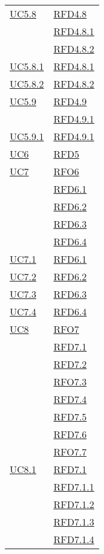 \begin{longtable}{|>{\centering}m{5cm}|m{5cm}<{\centering}|}
\hyperref[UC5.8]{UC5.8} & \hyperlink{RFD4.8}{RFD4.8}\\
& \hyperlink{RFD4.8.1}{RFD4.8.1}\\
& \hyperlink{RFD4.8.2}{RFD4.8.2}\\ \hline
\hyperref[UC5.8.1]{UC5.8.1} & \hyperlink{RFD4.8.1}{RFD4.8.1}\\ \hline
\hyperref[UC5.8.2]{UC5.8.2} & \hyperlink{RFD4.8.2}{RFD4.8.2}\\ \hline
\hyperref[UC5.9]{UC5.9} & \hyperlink{RFD4.9}{RFD4.9}\\
& \hyperlink{RFD4.9.1}{RFD4.9.1}\\ \hline
\hyperref[UC5.9.1]{UC5.9.1} & \hyperlink{RFD4.9.1}{RFD4.9.1}\\ \hline
\hyperref[UC6]{UC6} & \hyperlink{RFD5}{RFD5}\\ \hline
\hyperref[UC7]{UC7} & \hyperlink{RFO6}{RFO6}\\
& \hyperlink{RFD6.1}{RFD6.1}\\
& \hyperlink{RFD6.2}{RFD6.2}\\
& \hyperlink{RFD6.3}{RFD6.3}\\
& \hyperlink{RFD6.4}{RFD6.4}\\ \hline
\hyperref[UC7.1]{UC7.1} & \hyperlink{RFD6.1}{RFD6.1}\\ \hline
\hyperref[UC7.2]{UC7.2} & \hyperlink{RFD6.2}{RFD6.2}\\ \hline
\hyperref[UC7.3]{UC7.3} & \hyperlink{RFD6.3}{RFD6.3}\\ \hline
\hyperref[UC7.4]{UC7.4} & \hyperlink{RFD6.4}{RFD6.4}\\ \hline
\hyperref[UC8]{UC8} & \hyperlink{RFO7}{RFO7}\\
& \hyperlink{RFD7.1}{RFD7.1}\\
& \hyperlink{RFD7.2}{RFD7.2}\\
& \hyperlink{RFO7.3}{RFO7.3}\\
& \hyperlink{RFD7.4}{RFD7.4}\\
& \hyperlink{RFD7.5}{RFD7.5}\\
& \hyperlink{RFD7.6}{RFD7.6}\\
& \hyperlink{RFO7.7}{RFO7.7}\\ \hline
\hyperref[UC8.1]{UC8.1} & \hyperlink{RFD7.1}{RFD7.1}\\
& \hyperlink{RFD7.1.1}{RFD7.1.1}\\
& \hyperlink{RFD7.1.2}{RFD7.1.2}\\
& \hyperlink{RFD7.1.3}{RFD7.1.3}\\
& \hyperlink{RFD7.1.4}{RFD7.1.4}\\

\end{longtable}
